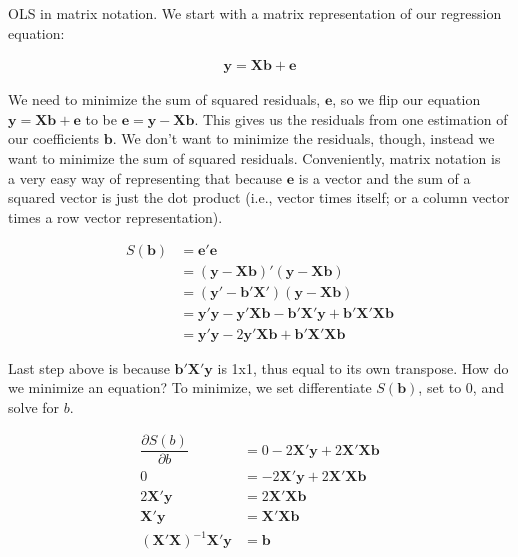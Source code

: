 \documentclass[a4paper,12pt]{article}
\newcommand{\matr}[1]{\mathbf{#1}}
\begin{document}
OLS in matrix notation. We start with a matrix representation of our regression equation:

\begin{align*}
\matr{y} = \matr{X} \matr{b} + \matr{e}
\end{align*}

We need to minimize the sum of squared residuals, $\matr{e}$, so we flip our equation $\matr{y} = \matr{X} \matr{b} + \matr{e}$ to be $\matr{e} = \matr{y} - \matr{X} \matr{b}$. This gives us the residuals from one estimation of our coefficients $\matr{b}$. We don't want to minimize the residuals, though, instead we want to minimize the sum of squared residuals. Conveniently, matrix notation is a very easy way of representing that because $\matr{e}$ is a vector and the sum of a squared vector is just the dot product (i.e., vector times itself; or a column vector times a row vector representation).


\begin{align*}
S(\matr{b}) & = \matr{e}'\matr{e}\\
  & = (\matr{y} - \matr{X} \matr{b})'(\matr{y} - \matr{X} \matr{b})\\
  & = (\matr{y}' - \matr{b}'\matr{X}')(\matr{y} - \matr{X} \matr{b})\\
  & = \matr{y}'\matr{y} - \matr{y}'\matr{X}\matr{b} - \matr{b}'\matr{X}'\matr{y} + \matr{b}'\matr{X}'\matr{X}\matr{b}\\
  & = \matr{y}'\matr{y} - 2\matr{y}'\matr{X}\matr{b} + \matr{b}'\matr{X}'\matr{X}\matr{b}
\end{align*}

Last step above is because $\matr{b}'\matr{X}'\matr{y}$ is 1x1, thus equal to its own transpose. How do we minimize an equation? To minimize, we set differentiate $S(\matr{b})$, set to 0, and solve for $b$.

\begin{align*}
\dfrac{\partial S(b)}{\partial b} & = 0 - 2\matr{X}'\matr{y} + 2 \matr{X}'\matr{X}\matr{b}\\
0 & = - 2\matr{X}'\matr{y} + 2 \matr{X}'\matr{X}\matr{b}\\
2\matr{X}'\matr{y} & = 2 \matr{X}'\matr{X}\matr{b}\\
\matr{X}'\matr{y} & = \matr{X}'\matr{X}\matr{b}\\
(\matr{X}'\matr{X})^{-1} \matr{X}'\matr{y} & = \matr{b}\\
\end{align*}
\end{document}
